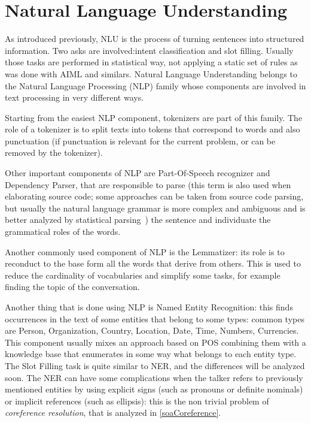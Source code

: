 \section{Natural Language Understanding}
\label{soaNLU}

As introduced previously, NLU is the process of turning sentences into structured information. Two asks are involved:intent classification and slot filling. Usually those tasks are performed in statistical way, not applying a static set of rules as was done with AIML and similars. Natural Language Understanding belongs to the Natural Language Processing (NLP) family whose components are involved in text processing in very different ways.

Starting from the easiest NLP component, tokenizers are part of this family. The role of a tokenizer is to split texts into tokens that correspond to words and also punctuation (if punctuation is relevant for the current problem, or can be removed by the tokenizer).

Other important components of NLP are Part-Of-Speech recognizer and Dependency Parser, that are responsible to parse (this term is also used when elaborating source code; some approaches can be taken from source code parsing, but usually the natural language grammar is more complex and ambiguous and is better analyzed by statistical parsing~\cite{ballesteros2015improved}) the sentence and individuate the grammatical roles of the words.

Another commonly used component of NLP is the Lemmatizer: its role is to reconduct to the base form all the words that derive from others. This is used to reduce the cardinality of vocabularies and simplify some tasks, for example finding the topic of the conversation.

Another thing that is done using NLP is Named Entity Recognition: this finds occurrences in the text of some entities that belong to some types: common types are Person, Organization, Country, Location, Date, Time, Numbers, Currencies. This component usually mixes an approach based on POS combining them with a knowledge base that enumerates in some way what belongs to each entity type. The Slot Filling task is quite similar to NER, and the differences will be analyzed soon. The NER can have some complications when the talker refers to previously mentioned entities by using explicit signs (such as pronouns or definite nominals) or implicit references (such as ellipsis): this is the non trivial problem of \textit{coreference resolution}, that is analyzed in \ref{soaCoreference}.

